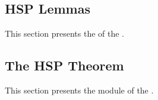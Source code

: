 \documentclass[a4paper,UKenglish,cleveref, autoref, thm-restate]{lipics-v2021}
\begin{document}
\subsection{HSP Lemmas}\label{sec:hsp-lemmas}
This section presents the \ualibLemmata of  the \agdaualib.


\subsection{The HSP Theorem}\label{sec:hsp-theorem}
This section presents the \ualibTheorem module of  the \agdaualib.




\end{document}
